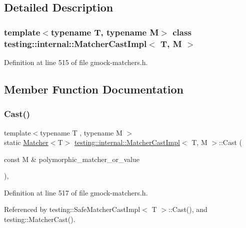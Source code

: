 \subsection{Detailed Description}
\subsubsection*{template$<$typename T, typename M$>$\newline
class testing\+::internal\+::\+Matcher\+Cast\+Impl$<$ T, M $>$}



Definition at line 515 of file gmock-\/matchers.\+h.



\subsection{Member Function Documentation}
\mbox{\label{classtesting_1_1internal_1_1MatcherCastImpl_a488bb69a7845f9198bbb198d8dbe41a8}} 
\subsubsection{\texorpdfstring{Cast()}{Cast()}}
{\footnotesize\ttfamily template$<$typename T , typename M $>$ \\
static \hyperlink{classtesting_1_1Matcher}{Matcher}$<$T$>$ \hyperlink{classtesting_1_1internal_1_1MatcherCastImpl}{testing\+::internal\+::\+Matcher\+Cast\+Impl}$<$ T, M $>$\+::Cast (\begin{DoxyParamCaption}\item[{const M \&}]{polymorphic\+\_\+matcher\+\_\+or\+\_\+value }\end{DoxyParamCaption})\hspace{0.3cm}{\ttfamily [inline]}, {\ttfamily [static]}}



Definition at line 517 of file gmock-\/matchers.\+h.



Referenced by testing\+::\+Safe\+Matcher\+Cast\+Impl$<$ T $>$\+::\+Cast(), and testing\+::\+Matcher\+Cast().


